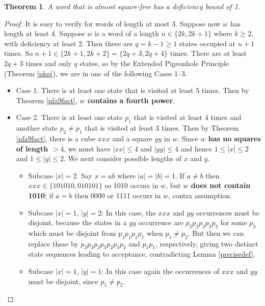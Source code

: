 \documentclass[12pt]{article}
\newcommand{\squarefree}{square-free}
\newcommand{\abs}[1]{\lvert#1\rvert}
\theoremstyle{plain}
\newtheorem{thm}{Theorem}
\theoremstyle{definition}
\theoremstyle{remark}
\begin{document}
			\begin{thm}\label{almostMain}
				A word that is almost {\squarefree} has a deficiency bound of 1.
			\end{thm}
			\begin{proof}
				It is easy to verify for words of length at most 3.
				Suppose now $w$ has length at least 4.
				Suppose $w$ is a word of a length $n \in \{2k, 2k+1\}$ where $k\ge 2$, with deficiency at least 2.
				Then there are $q = k - 1\ge 1$ states occupied at $n + 1$ times.
				So $n+1 \in \{2k+1, 2k+2\} = \{2q+3, 2q+4\}$ times.
				There are at least $2q + 3$ times and only $q$ states, so
				by the Extended Pigeonhole Principle (Theorem \ref{php}), we are in one of the following
				Cases 1--3.
				\begin{itemize}
					\item{}
						Case 1. There is at least one state that is visited at least 5 times.
						Then by Theorem \ref{nfa9fact}, \textbf{$w$ contains a fourth power}.
					\item{}
						Case 2. There is at least one state $p_1$ that is visited at least 4 times
						and another state $p_2\ne p_1$ that is visited at least 3 times.
						Then by Theorem \ref{nfa9fact}, there is a cube $xxx$ and a square $yy$ in $w$.
						Since \textbf{$w$ has no squares of length $>4$}, we must have
						$\abs{xx}\le 4$ and $\abs{yy}\le 4$ and hence $1\le \abs{x}\le 2$ and $1\le \abs{y}\le 2$.
						We next consider possible lengths of $x$ and $y$.
						\begin{itemize}
							\item{}
								Subcase $\abs{x}= 2$. Say $x=ab$ where $\abs{a}=\abs{b}=1$.
								If $a\ne b$ then $xxx\in\{101010,010101\}$ so 1010 occurs in $w$, but \textbf{$w$ does not contain 1010};
								if $a=b$ then 0000 or 1111 occurs in $w$, contra assumption.
							\item{} Subcase $\abs{x}=1$, $\abs{y}= 2$:
								In this case, the $xxx$ and $yy$ occurrences must be disjoint,
								because the states in a $yy$ occurrence are $p_2 p_3p_2p_3p_2$ for some
								$p_3$ which must be disjoint from $p_1p_1p_1p_1$ when $p_1\ne p_2$.
								But then we can replace these by $p_2p_3p_2p_3p_2p_3p_2$ and $p_1p_1$, respectively,
								giving two distinct state sequences leading to acceptance, contradicting Lemma \ref{precisedef}.
							\item{}
								Subcase $\abs{x}=1$, $\abs{y}=1$:
								In this case again the occurrences of $xxx$ and $yy$ must be disjoint, since $p_1\ne p_2$.

\end{itemize}
\end{itemize}
\end{proof}
\end{document}
